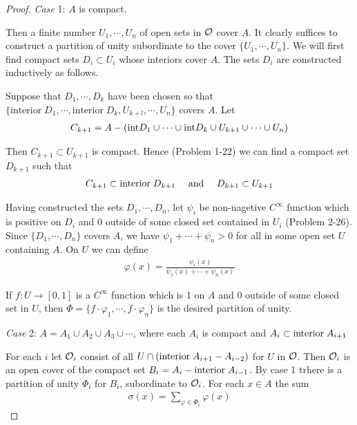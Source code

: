 \begin{proof}
    \textit{Case} 1: $A$ is compact.\par 
    Then a finite number $U_1, \cdots, U_n$ of open sets in $\mathcal{O}$ cover $A$.
    It clearly suffices to construct a partition of unity subordinate
    to the cover $\{U_1, \cdots, U_n\}$. We will first find compact sets $D_i \subset U_i$ 
    whose interiors cover $A$. The sets $D_i$ are constructed inductively as follows.
    
    Suppose that $D_1, \cdots ,D_k$ have been chosen so that \\
    $\{\text{interior}\; D_1, \cdots, \text{interior}\;D_k, U_{k+l}, \cdots, U_n\}$ covers $A$. Let 
    \begin{align*}
        C_{k+1} = 
        A - (\mathrm{int} D_1\cup \cdots \cup \mathrm{int} D_k \cup U_{k+1} \cup \cdots \cup U_n)
    \end{align*}
    
    Then $C_{k+1}\subset U_{k+1}$ is compact. Hence (Problem 1-22) we can find a compact set
    $D_{k+1}$ such that 
    \begin{align*}
        C_{k+1} \subset \mathrm{interior}\; D_{k+1} && \text{ and } && D_{k+1} \subset U_{k+1}
    \end{align*} 

    Having constructed the sets $D_1, \cdots, D_n$, let $\psi_i$  be non-nagetive $C^\infty$
    function which is positive on $D_i$ and 0 outside of some closed set contained in $U_i$ (Problem 
    2-26). Since $\{D_1, \cdots, D_n\}$ covers $A$, we have $\psi_1+\cdots +\psi_n>0$ for all 
    in some open set $U$ containing $A$. On $U$ we can define 
    \begin{align*}
        \varphi(x) = \frac{\psi_i(x)}{\psi_1(x)+\cdots +\psi_n(x)}
    \end{align*}

    If $f:U\to [0,1]$ is a $C^\infty$ function which is 1 on $A$ and 0 outside of some closed set
    in $U$, then $\Phi = \{f\cdot \varphi_1, \cdots, f\cdot\varphi_n\}$ is the desired partition of 
    unity.

    \textit{Case} 2: $A = A_1\cup A_2\cup A_3\cup \cdots $, where each $A_i$ is compact 
    and $A_i\subset \mathrm{interior}\; A_{i+1}$\par 
    For each $i$ let $\mathcal{O}_i$ consist of all $U\cap (\mathrm{interior}\;A_{i+1}-A_{i-2})$ for $U$ in 
    $\mathcal{O}$. Then $\mathcal{O}_i$ is an open cover of the compact set $B_i=A_i - \mathrm{interior}\; A_{i-1}$. 
    By case 1 trhere is a partition of unity $\Phi_i$ for $B_i$, subordinate to $\mathcal{O}_i$. For 
    each $x\in A$ the sum 
    \begin{align*}
        \sigma(x) = \sum_{\varphi\in \Phi_i} \varphi(x)
    \end{align*} 


\end{proof}
